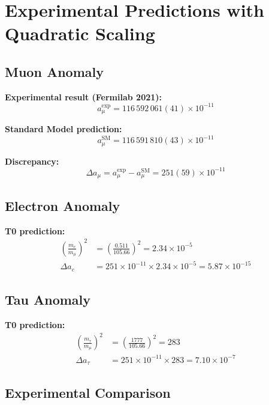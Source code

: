 \documentclass[12pt,a4paper]{article}
\begin{document}
	\section{Experimental Predictions with Quadratic Scaling}
	
	\subsection{Muon Anomaly}
	
	\textbf{Experimental result (Fermilab 2021):}
	\begin{equation}
		a_\mu^{\text{exp}} = 116\,592\,061(41) \times 10^{-11}
	\end{equation}
	
	\textbf{Standard Model prediction:}
	\begin{equation}
		a_\mu^{\text{SM}} = 116\,591\,810(43) \times 10^{-11}
	\end{equation}
	
	\textbf{Discrepancy:}
	\begin{equation}
		\Delta a_\mu = a_\mu^{\text{exp}} - a_\mu^{\text{SM}} = 251(59) \times 10^{-11}
	\end{equation}
	
	\subsection{Electron Anomaly}
	
	\textbf{T0 prediction:}
	\begin{align}
		\left(\frac{m_e}{m_\mu}\right)^2 &= \left(\frac{0.511}{105.66}\right)^2 = 2.34 \times 10^{-5} \\
		\Delta a_e &= 251 \times 10^{-11} \times 2.34 \times 10^{-5} = 5.87 \times 10^{-15}
	\end{align}
	
	\subsection{Tau Anomaly}
	
	\textbf{T0 prediction:}
	\begin{align}
		\left(\frac{m_\tau}{m_\mu}\right)^2 &= \left(\frac{1777}{105.66}\right)^2 = 283 \\
		\Delta a_\tau &= 251 \times 10^{-11} \times 283 = 7.10 \times 10^{-7}
	\end{align}
	
	\subsection{Experimental Comparison}
	
\end{document}
